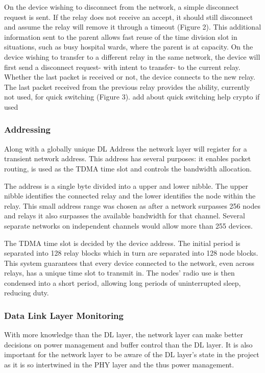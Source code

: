 On the device wishing to disconnect from the network, a simple disconnect request is sent. If the
relay does not receive an accept, it should still disconnect and assume the relay will remove it
through a timeout (Figure 2). This additional information sent to the parent allows fast reuse of the
time division slot in situations, such as busy hospital wards, where the parent is at capacity.
On the device wishing to transfer to a different relay in the same network, the device will first send a
disconnect request- with intent to transfer- to the current relay. Whether the last packet is received
or not, the device connects to the new relay. The last packet received from the previous relay
provides the ability, currently not used, for quick switching (Figure 3). {add about quick switching
help crypto if used}

\subsubsection{Addressing}
Along with a globally unique DL Address the network layer will register for a transient network
address. This address has several purposes: it enables packet routing, is used as the TDMA time slot
and controls the bandwidth allocation.


The address is a single byte divided into a upper and lower nibble. The upper nibble identifies the
connected relay and the lower identifies the node within the relay. This small address range was
chosen as after a network surpasses 256 nodes and relays it also surpasses the available bandwidth
for that channel. Several separate networks on independent channels would allow more than 255
devices.


The TDMA time slot is decided by the device address. The initial period is separated into 128 relay
blocks which in turn are separated into 128 node blocks. This system guarantees that every device
connected to the network, even across relays, has a unique time slot to transmit in. The nodes’ radio
use is then condensed into a short period, allowing long periods of uninterrupted sleep, reducing
duty.


\subsubsection{Data Link Layer Monitoring}
With more knowledge than the DL layer, the network layer can make better decisions on power
management and buffer control than the DL layer. It is also important for the network layer to be
aware of the DL layer’s state in the project as it is so intertwined in the PHY layer and the thus power
management.

